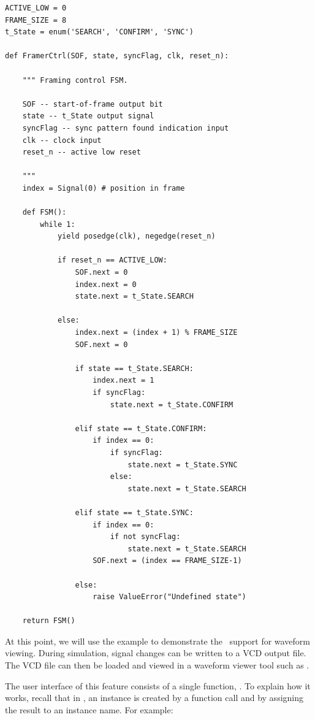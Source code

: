 \begin{verbatim}
ACTIVE_LOW = 0
FRAME_SIZE = 8
t_State = enum('SEARCH', 'CONFIRM', 'SYNC')

def FramerCtrl(SOF, state, syncFlag, clk, reset_n):
    
    """ Framing control FSM.

    SOF -- start-of-frame output bit
    state -- t_State output signal
    syncFlag -- sync pattern found indication input
    clk -- clock input
    reset_n -- active low reset
    
    """
    index = Signal(0) # position in frame

    def FSM():
        while 1:
            yield posedge(clk), negedge(reset_n)
            
            if reset_n == ACTIVE_LOW:
                SOF.next = 0
                index.next = 0
                state.next = t_State.SEARCH

            else:
                index.next = (index + 1) % FRAME_SIZE
                SOF.next = 0

                if state == t_State.SEARCH:
                    index.next = 1
                    if syncFlag:
                        state.next = t_State.CONFIRM

                elif state == t_State.CONFIRM:
                    if index == 0:
                        if syncFlag:
                            state.next = t_State.SYNC
                        else:
                            state.next = t_State.SEARCH

                elif state == t_State.SYNC:
                    if index == 0:
                        if not syncFlag:
                            state.next = t_State.SEARCH
                    SOF.next = (index == FRAME_SIZE-1)

                else:
                    raise ValueError("Undefined state")

    return FSM()
\end{verbatim}

At this point, we will use the example to demonstrate
the \myhdl\ support for waveform viewing.
During simulation, signal
changes can be written to a VCD output file.  The VCD file can then be
loaded and viewed in a waveform viewer tool such as .

The user interface of this feature consists of a single function,
.  To explain how it works, recall that in
\myhdl{}, an instance is created by a function call and by assigning
the result to an instance name. For example:

